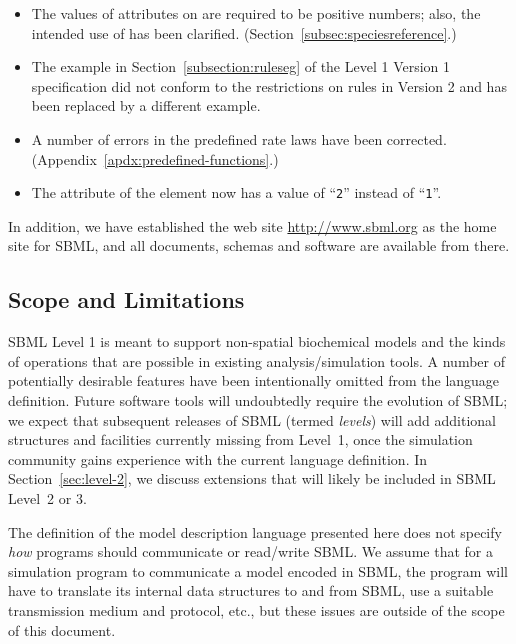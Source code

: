 \documentclass[10pt]{cekarticle}
\newcommand{\changed}[1]{\textcolor{BrickRed}{#1}}
\newenvironment{blockChanged}{\color{BrickRed}}{}
\begin{document}
\begin{blockChanged}
\begin{itemize}
\item The values of attributes on  are required to
  be positive numbers; also, the intended use of 
  has been clarified.  (Section~\ref{subsec:speciesreference}.)
  
\item The example in Section~\ref{subsection:ruleseg} of the Level 1
  Version 1 specification did not conform to the restrictions on rules in
  Version 2 and has been replaced by a different example.

\item A number of errors in the predefined rate laws have been corrected.
  (Appendix~\ref{apdx:predefined-functions}.)

\item The  attribute of the  element now has a
  value of ``\texttt{2}'' instead of ``\texttt{1}''.
  
\end{itemize}

In addition, we have established the web site \url{http://www.sbml.org} as
the home site for SBML, and all documents, schemas and software are
available from there.

\end{blockChanged}


\subsection{Scope and Limitations}

SBML Level 1 is meant to support non-spatial biochemical models and the
kinds of operations that are possible in existing analysis/simulation
tools.  A number of potentially desirable features have been intentionally
omitted from the language definition.  Future software tools will
undoubtedly require the evolution of SBML; we expect that subsequent
releases of SBML (termed \emph{levels}) will add additional structures and
facilities currently missing from Level~1, once the simulation community
gains experience with the current language definition.  In
Section~\ref{sec:level-2}, we discuss extensions that will likely be
included in SBML Level~2 \changed{or 3}.

The definition of the model description language presented here does not
specify \emph{how} programs should communicate or read/write SBML.  We
assume that for a simulation program to communicate a model encoded in
SBML, the program will have to translate its internal data structures to
and from SBML, use a suitable transmission medium and protocol, etc., but
these issues are outside of the scope of this document.
\end{document}
